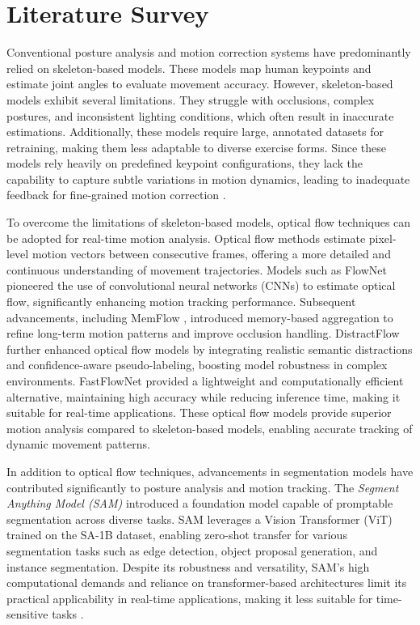 \documentclass[conference]{IEEEtran}
\begin{document}
\section{Literature Survey}
Conventional posture analysis and motion correction systems have predominantly relied on skeleton-based models. These models map human keypoints and estimate joint angles to evaluate movement accuracy. However, skeleton-based models exhibit several limitations. They struggle with occlusions, complex postures, and inconsistent lighting conditions, which often result in inaccurate estimations. Additionally, these models require large, annotated datasets for retraining, making them less adaptable to diverse exercise forms. Since these models rely heavily on predefined keypoint configurations, they lack the capability to capture subtle variations in motion dynamics, leading to inadequate feedback for fine-grained motion correction \cite{paper9}.  

To overcome the limitations of skeleton-based models, optical flow techniques can be adopted for real-time motion analysis. Optical flow methods estimate pixel-level motion vectors between consecutive frames, offering a more detailed and continuous understanding of movement trajectories. Models such as FlowNet \cite{flownet2015} pioneered the use of convolutional neural networks (CNNs) to estimate optical flow, significantly enhancing motion tracking performance. Subsequent advancements, including MemFlow \cite{memflow2024}, introduced memory-based aggregation to refine long-term motion patterns and improve occlusion handling. DistractFlow \cite{distractflow2023} further enhanced optical flow models by integrating realistic semantic distractions and confidence-aware pseudo-labeling, boosting model robustness in complex environments. FastFlowNet \cite{fastflownet2023} provided a lightweight and computationally efficient alternative, maintaining high accuracy while reducing inference time, making it suitable for real-time applications. These optical flow models provide superior motion analysis compared to skeleton-based models, enabling accurate tracking of dynamic movement patterns.  

In addition to optical flow techniques, advancements in segmentation models have contributed significantly to posture analysis and motion tracking. The \textit{Segment Anything Model (SAM)} introduced a foundation model capable of promptable segmentation across diverse tasks. SAM leverages a Vision Transformer (ViT) trained on the SA-1B dataset, enabling zero-shot transfer for various segmentation tasks such as edge detection, object proposal generation, and instance segmentation. Despite its robustness and versatility, SAM's high computational demands and reliance on transformer-based architectures limit its practical applicability in real-time applications, making it less suitable for time-sensitive tasks \cite{sam2023}.  
\end{document}
